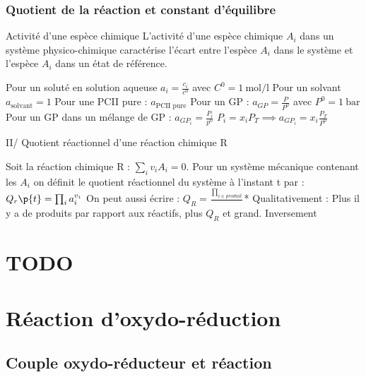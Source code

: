     \subsubsection{Quotient de la réaction et constant d'équilibre}
    
    \begin{definition}{Activité d'une espèce chimique}{}
        L'activité d'une espèce chimique $A_i$ dans un système physico-chimique caractérise l'écart entre l'espèce $A_i$ dans le système et l'espèce $A_i$ dans un état de référence.
        \begin{enumerate}
            \itt Pour un soluté en solution aqueuse $a_i = \frac{c_i}{c^0}$ avec $C^0 = \qty{1}{\mol\per\litre}$
            \itt Pour un solvant $a_{\text{solvant}} = 1$
            \itt Pour une PCII pure : $a_{\text{PCII pure}}$
            \itt Pour un GP : $a_{GP} = \frac{P}{P^0}$ avec $P^0 = \qty{1}{\bar}$
            \itt Pour un GP dans un mélange de GP : $a_{GP_i} = \frac{P_i}{p^0}$
            $P_i = x_i P_T \implies a_{GP_i} = x_i\frac{P_T}{P^0}$
        \end{enumerate}
        
    \end{definition}
    
    II/ Quotient réactionnel d'une réaction chimique R
    
    Soit la réaction chimique R : $\sum_i v_iA_i = 0$.
    Pour un système mécanique contenant les $A_i$ on définit le quotient réactionnel du système à l'instant t par :
    $Q_r\p{t} = \prod_i a_i^{v_i}$
    On peut aussi écrire :
    $Q_R = \frac{\prod_{i \in produit}}{}$*
    Qualitativement :
    Plus il y a de produits par rapport aux réactifs, plus $Q_R$ et grand. Inversement
    
    \section{TODO}
    
    \newpage
    
    \section{Réaction d'oxydo-réduction}
    
    \subsection{Couple oxydo-réducteur et réaction}
    
